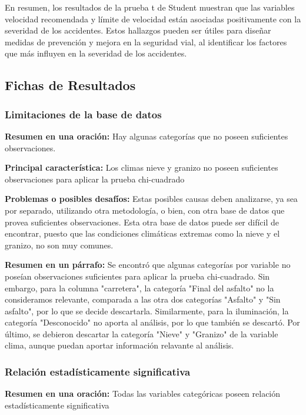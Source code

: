 \documentclass{book}
\begin{document}
En resumen, los resultados de la prueba t de Student muestran que las variables velocidad recomendada y límite de velocidad están asociadas positivamente con la severidad de los accidentes. Estos hallazgos pueden ser útiles para diseñar medidas de prevención y mejora en la seguridad vial, al identificar los factores que más influyen en la severidad de los accidentes.





\newpage
\subsection{Fichas de Resultados}

\subsubsection{Limitaciones de la base de datos}
\textbf{Resumen en una oración:} Hay algunas categorías que no poseen suficientes observaciones.

\textbf{Principal característica:} Los climas nieve y granizo no poseen suficientes observaciones para aplicar la prueba chi-cuadrado

\textbf{Problemas o posibles desafíos:} Estas posibles causas deben analizarse, ya sea por separado, utilizando otra metodología, o bien, con otra base de datos que provea suficientes observaciones. Esta otra base de datos puede ser difícil de encontrar, puesto que las condiciones climáticas extremas como la nieve y el granizo, no son muy comunes.

\textbf{Resumen en un párrafo:} Se encontró que algunas categorías por variable no poseían observaciones suficientes para aplicar la prueba chi-cuadrado. Sin embargo, para la columna "carretera", la categoría "Final del asfalto" no la consideramos relevante, comparada a las otra dos categorías "Asfalto" y "Sin asfalto", por lo que se decide descartarla. Similarmente, para la iluminación, la categoría "Desconocido" no aporta al análisis, por lo que también se descartó. Por último, se debieron descartar la categoría "Nieve" y "Granizo" de la variable clima, aunque puedan aportar información relavante al análisis.


\subsubsection{Relación estadísticamente significativa}
\textbf{Resumen en una oración:} Todas las variables categóricas poseen relación estadísticamente significativa
\end{document}
